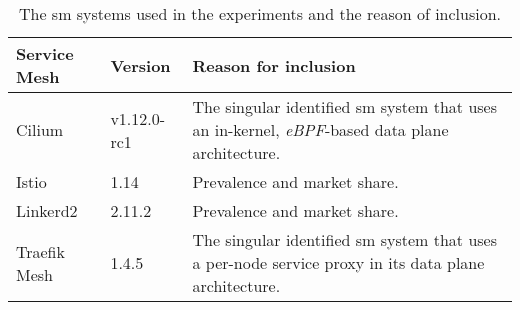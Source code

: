 \begin{table*}[t]
\centering

\begin{tabularx}{\linewidth}{llX}

    \toprule
    Service Mesh       & Version & Reason for inclusion \\
    \toprule
    
    Cilium &
    v1.12.0-rc1 &
    The singular identified \gls{sm} system that uses an in-kernel, \textit{eBPF}-based data plane architecture.
    \\
    
    Istio &
    1.14 &
    Prevalence and market share.
    \\
    
    Linkerd2 &
    2.11.2 &
    Prevalence and market share.
    \\
    
    Traefik Mesh&
    1.4.5 &
    The singular identified \gls{sm} system that uses a per-node service proxy in its  data plane architecture.
    \\
    
    \bottomrule
    
\end{tabularx}

\caption[The \gls{sm} systems used in the experiments.]{The \gls{sm} systems used in the experiments and the reason of inclusion.}
\label{tab:experiment:design:mesh}
\end{table*}

